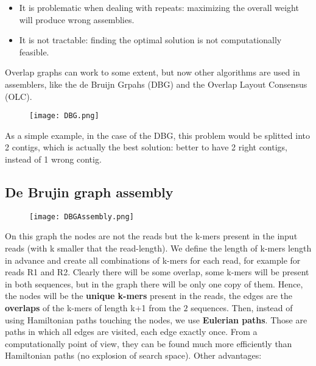 \begin{itemize}
    \item It is problematic when dealing with repeats: maximizing the overall weight will produce wrong assemblies.
    \item It is not tractable: finding the optimal solution is not computationally feasible.
\end{itemize}

Overlap graphs can work to some extent, but now other algorithms are used in assemblers, like the de Bruijn Grpahs (DBG) and the Overlap Layout Consensus (OLC).

\begin{figure}[h]
\centering
\texttt{[image: DBG.png]}
\caption{}
\end{figure}

As a simple example, in the case of the DBG, this problem would be splitted into 2 contigs, which is actually the best solution: better to have 2 right contigs, instead of 1 wrong contig.

\subsection{De Brujin graph assembly}

\begin{figure}[h]
\centering
\texttt{[image: DBGAssembly.png]}
\caption{}
\end{figure}

On this graph the nodes are not the reads but the k-mers present in the input reads (with k smaller that the read-length). We define the length of k-mers length in advance and create all combinations of k-mers for each read, for example for reads R1 and R2. Clearly there will be some overlap, some k-mers will be present in both sequences, but in the graph there will be only one copy of them.
Hence, the nodes will be the \textbf{unique k-mers} present in the reads, the edges are the \textbf{overlaps} of the k-mers of length k+1 from the $2$ sequences.
Then, instead of using Hamiltonian paths touching the nodes, we use \textbf{Eulerian paths}. 
Those are paths in which all edges are visited, each edge exactly once. From a computationally point of view, they can be found much more efficiently than Hamiltonian paths (no explosion of search space).
Other advantages: 

